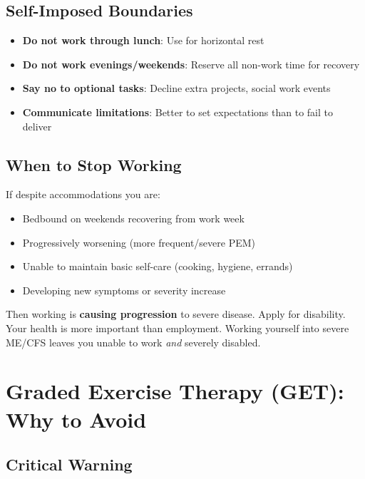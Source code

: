 \subsection{Self-Imposed Boundaries}

\begin{itemize}
    \item \textbf{Do not work through lunch}: Use for horizontal rest
    \item \textbf{Do not work evenings/weekends}: Reserve all non-work time for recovery
    \item \textbf{Say no to optional tasks}: Decline extra projects, social work events
    \item \textbf{Communicate limitations}: Better to set expectations than to fail to deliver
\end{itemize}

\subsection{When to Stop Working}

\begin{warning}
If despite accommodations you are:
\begin{itemize}
    \item Bedbound on weekends recovering from work week
    \item Progressively worsening (more frequent/severe PEM)
    \item Unable to maintain basic self-care (cooking, hygiene, errands)
    \item Developing new symptoms or severity increase
\end{itemize}

Then working is \textbf{causing progression} to severe disease. Apply for disability. Your health is more important than employment. Working yourself into severe ME/CFS leaves you unable to work \emph{and} severely disabled.
\end{warning}

\section{Graded Exercise Therapy (GET): Why to Avoid}
\label{sec:get-avoidance}

\subsection{Critical Warning}

